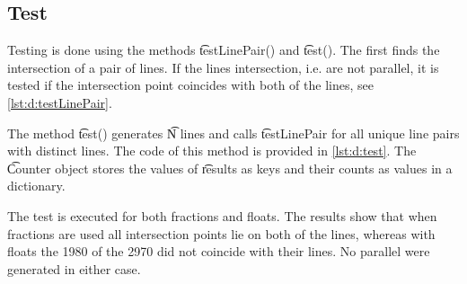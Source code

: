 	

\subsection*{Test}
	Testing is done using the methods \t{testLinePair()} and \t{test()}. The first finds the intersection of a pair of lines. If the lines intersection, i.e. are not parallel, it is tested if the intersection point coincides with both of the lines, see \autoref{lst:d:testLinePair}.

	

	The  method \t{test()} generates \t{N} lines and calls \t{testLinePair} for all unique line pairs with distinct lines. The code of this method is provided in \autoref{lst:d:test}. The \t{Counter} object stores the values of \t{results} as keys and their counts as values in a dictionary. 

	

	The test is executed for both fractions and floats. The results show that when fractions are used all intersection points lie on both of the lines, whereas with floats the 1980 of the 2970 did not coincide with their lines. No parallel were generated in either case.